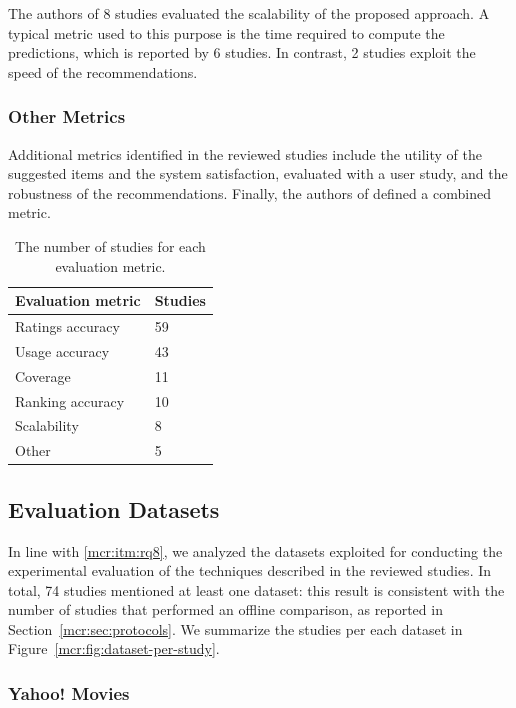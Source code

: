 The authors of 8 studies evaluated the scalability of the proposed approach. A typical metric used to this purpose is the time required to compute the predictions, which is reported by 6 studies. In contrast, 2 studies exploit the speed of the recommendations.

\subsubsection{Other Metrics}

Additional metrics identified in the reviewed studies include the utility of the suggested items and the system satisfaction, evaluated with a user study, and the robustness of the recommendations. Finally, the authors of  defined a combined metric.

\begin{table}
\centering
\begin{tabular}{@{}ll@{}}
\toprule
Evaluation metric & Studies \\ \midrule
Ratings accuracy  & 59      \\
Usage accuracy    & 43      \\
Coverage          & 11      \\
Ranking accuracy  & 10      \\
Scalability       & 8       \\
Other             & 5       \\ \bottomrule
\end{tabular}
\caption[Studies per evaluation metric]{The number of studies for each evaluation metric.}
\label{mcr:tab:metrics}
\end{table}

\subsection{Evaluation Datasets}
\label{mcr:sec:datasets}

In line with \ref{mcr:itm:rq8}, we analyzed the datasets exploited for conducting the experimental evaluation of the techniques described in the reviewed studies. In total, 74 studies mentioned at least one dataset: this result is consistent with the number of studies that performed an offline comparison, as reported in Section~\ref{mcr:sec:protocols}. We summarize the studies per each dataset in Figure~\ref{mcr:fig:dataset-per-study}.

\subsubsection{Yahoo! Movies}


